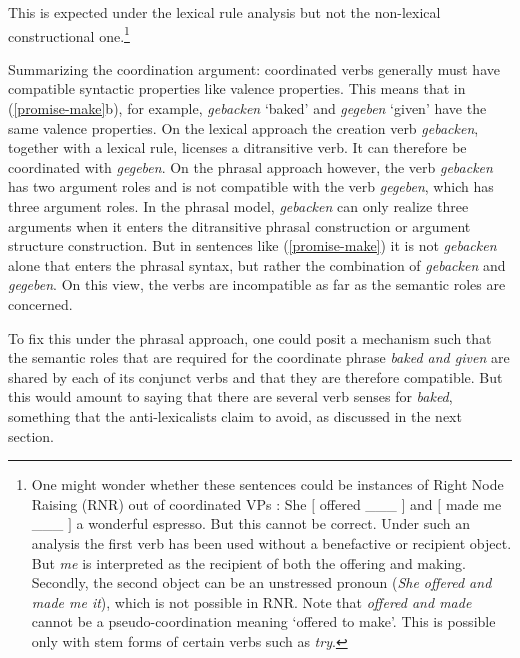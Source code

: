 \noindent
This is expected under the lexical rule analysis but not the non-lexical constructional one.\footnote{%
One might wonder whether these sentences could be instances of Right Node Raising (RNR) out of coordinated VPs \citep{Bresnan74a-u, Abbott76a-u}:  
\ea \label{rnr}
She $[$ offered  \_\_\_  $]$ and $[$ made me \_\_\_ $]$  a wonderful espresso. 
\z
But this cannot be correct.  
Under such an analysis the first verb has been used without a
benefactive or recipient object.  But \emph{me} is interpreted as the recipient of both the offering and making.
Secondly, the second object can be an unstressed pronoun (\emph{She offered and made me it}), which is not possible in RNR.  Note that \emph{offered and made} cannot be a pseudo-coordination meaning `offered to make'.  This is possible only with stem forms of certain verbs such as \emph{try}.}  

Summarizing the coordination argument:  coordinated verbs generally must have compatible syntactic properties like valence properties.  This means that in (\ref{promise-make}b), for example,
\emph{gebacken} `baked' and \emph{gegeben} `given' have the same valence properties. 
On the lexical approach the creation verb
\emph{gebacken}, together with a lexical rule, licenses a ditransitive verb.  It can therefore be coordinated with \emph{gegeben}. On the phrasal
approach however, the verb \emph{gebacken} has two argument roles and is not compatible with the verb
\emph{gegeben}, which has three argument roles. In the phrasal model, \emph{gebacken} can only realize three arguments when it
enters the ditransitive phrasal construction or argument structure construction.  But in sentences like (\ref{promise-make}) it is not
\emph{gebacken} alone that enters the phrasal syntax, but rather the combination of \emph{gebacken} and
\emph{gegeben}. On this view, the verbs are incompatible as far as the semantic roles are concerned. 

To fix this under the phrasal approach, one could posit a mechanism such that the semantic roles that are required for the coordinate phrase \emph{baked and
  given} %
  are shared by each of its conjunct verbs and that they are therefore compatible.  But this would
  amount to saying that there are several verb senses for \emph{baked}, something that the
  anti-lexicalists claim to avoid, as discussed in the next section.

